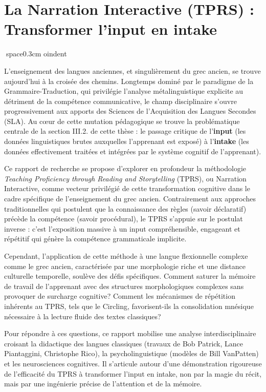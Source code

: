 

\section{La Narration Interactive (TPRS) : Transformer l'input en intake}
space{0.3cm}
oindent

L'enseignement des langues anciennes, et singulièrement du grec ancien, se trouve aujourd'hui à la
croisée des chemins. Longtemps dominé par le paradigme de la Grammaire-Traduction, qui privilégie
l'analyse métalinguistique explicite au détriment de la compétence communicative, le champ
disciplinaire s'ouvre progressivement aux apports des Sciences de l'Acquisition des Langues Secondes
(SLA). Au cœur de cette mutation pédagogique se trouve la problématique centrale de la section
III.2.\cite{III-2-3-ref3} de cette thèse : le passage critique de l'\textbf{input} (les données
linguistiques brutes auxquelles l'apprenant est exposé) à l'\textbf{intake} (les données
effectivement traitées et intégrées par le système cognitif de l'apprenant).

Ce rapport de recherche se propose d'explorer en profondeur la méthodologie \textit{Teaching
Proficiency through Reading and Storytelling} (TPRS), ou Narration Interactive, comme vecteur
privilégié de cette transformation cognitive dans le cadre spécifique de l'enseignement du grec
ancien. Contrairement aux approches traditionnelles qui postulent que la connaissance des règles
(savoir déclaratif) précède la compétence (savoir procédural), le TPRS s'appuie sur le postulat
inverse : c'est l'exposition massive à un input compréhensible, engageant et répétitif qui génère la
compétence grammaticale implicite.\cite{III-2-3-ref1}

Cependant, l'application de cette méthode à une langue flexionnelle complexe comme le grec ancien,
caractérisée par une morphologie riche et une distance culturelle temporelle, soulève des défis
spécifiques. Comment saturer la mémoire de travail de l'apprenant avec des structures morphologiques
complexes sans provoquer de surcharge cognitive? Comment les mécanismes de répétition inhérents au
TPRS, tels que le \og Circling\fg{}, favorisent-ils la consolidation mnésique nécessaire à la
lecture fluide des textes classiques?

Pour répondre à ces questions, ce rapport mobilise une analyse interdisciplinaire croisant la
didactique des langues classiques (travaux de Bob Patrick, Lance Piantaggini, Christophe Rico), la
psycholinguistique (modèles de Bill VanPatten) et les neurosciences cognitives. Il s'articule autour
d'une démonstration rigoureuse de l'efficacité du TPRS à transformer l'input en intake, non par la
magie du récit, mais par une ingénierie précise de l'attention et de la mémoire.




